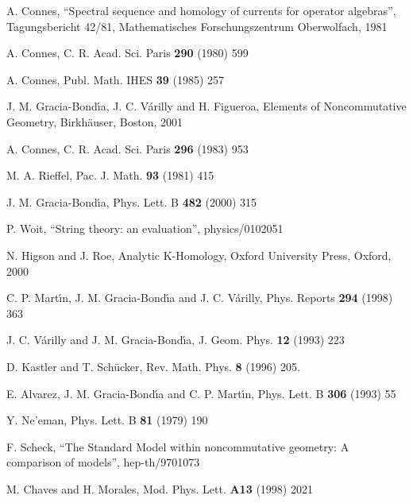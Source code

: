 \documentclass[a4paper,12pt]{article}
\newcommand{\1}{\mathbf{1}}         %
\newcommand{\7}{\dagger}            %
\newcommand{\8}{\bullet}            %
\renewcommand{\.}{\cdot}            %
\renewcommand{\:}{\colon}           %
\begin{document}
\begin{thebibliography}{92}

A. Connes,
``Spectral sequence and homology of currents for operator algebras'',
Tagungsbericht 42/81,
Mathematisches Forschungszentrum Oberwolfach, 1981

A. Connes,
C. R. Acad. Sci. Paris {\bf 290} (1980) 599

A. Connes,
Publ. Math. IHES {\bf 39} (1985) 257

J. M. Gracia-Bond\'{\i}a, J. C. V\'arilly and H. Figueroa,
Elements of Noncommutative Geometry,
Birkh\"auser, Boston, 2001

A. Connes,
C. R. Acad. Sci. Paris {\bf 296} (1983) 953

M. A. Rieffel,
Pac. J. Math. {\bf 93} (1981) 415

J. M. Gracia-Bond\'{\i}a,
Phys. Lett. B {\bf 482} (2000) 315

P. Woit,
``String theory: an evaluation'',
physics/0102051

N. Higson and J. Roe,
Analytic K-Homology,
Oxford University Press, Oxford, 2000

C. P. Mart\'{\i}n, J. M. Gracia-Bond\'{\i}a and J. C. V\'arilly,
Phys. Reports {\bf 294} (1998) 363

J. C. V\'arilly and J. M. Gracia-Bond\'{\i}a,
J. Geom. Phys. {\bf 12} (1993) 223

D. Kastler and T. Sch\"ucker,
Rev. Math. Phys. {\bf 8} (1996) 205.

E. Alvarez, J. M. Gracia-Bond\'{\i}a and C. P. Mart\'{\i}n,
Phys. Lett. B {\bf 306} (1993) 55

Y. Ne'eman,
Phys. Lett. B {\bf 81} (1979) 190

F. Scheck,
``The Standard Model within noncommutative geometry: A comparison of
models'',
hep-th/9701073

M. Chaves and H. Morales,
Mod. Phys. Lett. {\bf A13} (1998) 2021


\end{thebibliography}
\end{document}
